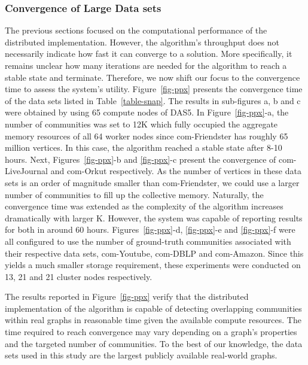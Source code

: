 \subsubsection{Convergence of Large Data sets}

The previous sections focused on the computational performance of the
distributed implementation. However, the algorithm's throughput does not
necessarily indicate how fast it can converge to a solution. More specifically, it
remains unclear how many iterations are needed for the algorithm to reach a
stable state and terminate. Therefore, we now shift our focus to the
convergence time to assess the system's utility. Figure~\ref{fig-ppx} presents
the convergence time of the data sets listed in Table~\ref{table-snap}.
%
The results in sub-figures a, b and c were obtained by using 65 compute nodes
of DAS5. In Figure~\ref{fig-ppx}-a, the number of communities was set to 12K
which fully occupied the aggregate memory resources of all 64 worker nodes since
com-Friendster has roughly 65 million vertices. In this case, the algorithm
reached a stable state after 8-10 hours. Next, Figures~\ref{fig-ppx}-b and
\ref{fig-ppx}-c present the convergence of com-LiveJournal and com-Orkut
respectively. As the number of vertices in these data sets is an order of
magnitude smaller than com-Friendster, we could use a larger number of
communities to fill up the collective memory. Naturally, the convergence time was extended as the complexity of
the algorithm increases dramatically with larger K. However, the system was
capable of reporting results for both in around 60 hours.
%
Figures~\ref{fig-ppx}-d, \ref{fig-ppx}-e and \ref{fig-ppx}-f were all
configured to use the number of ground-truth communities associated with
their respective data sets, com-Youtube, com-DBLP and com-Amazon. Since this
yields a much smaller storage requirement,
these experiments were conducted on 13, 21 and 21 cluster nodes respectively.

The results reported in Figure~\ref{fig-ppx} verify that the distributed
implementation of the algorithm is capable of detecting overlapping communities
within real graphs in reasonable time given the available compute resources.
The time required to reach convergence may vary depending on a graph's properties and
the targeted number of communities. To the best of our knowledge, the data sets
used in this study are the largest publicly available real-world graphs.

